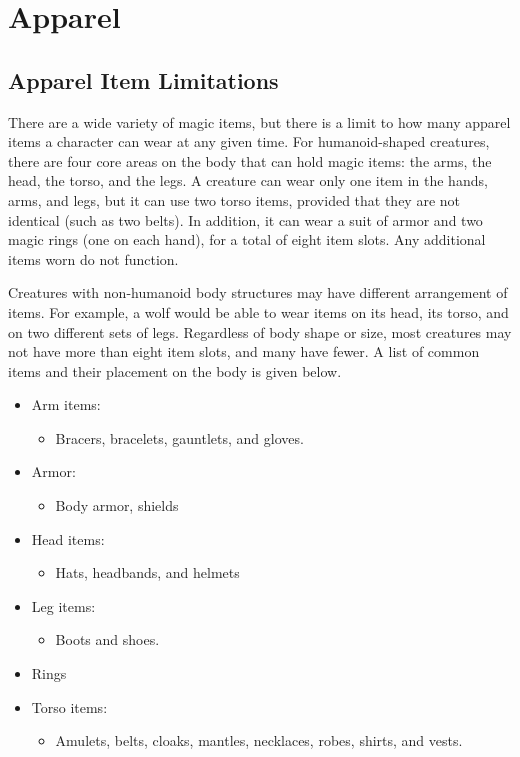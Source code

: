 \section{Apparel}

    \subsection{Apparel Item Limitations}

        There are a wide variety of magic items, but there is a limit to how many apparel items a character can wear at any given time.
        For humanoid-shaped creatures, there are four core areas on the body that can hold magic items: the arms, the head, the torso, and the legs.
        A creature can wear only one item in the hands, arms, and legs, but it can use two torso items, provided that they are not identical (such as two belts).
        In addition, it can wear a suit of armor and two magic rings (one on each hand), for a total of eight item slots.
        Any additional items worn do not function.

        Creatures with non-humanoid body structures may have different arrangement of items.
        For example, a wolf would be able to wear items on its head, its torso, and on two different sets of legs.
        Regardless of body shape or size, most creatures may not have more than eight item slots, and many have fewer.
        A list of common items and their placement on the body is given below.

        \begin{itemize}
            \item Arm items:
                \begin{itemize}
                    \item Bracers, bracelets, gauntlets, and gloves.
                \end{itemize}
            \item Armor:
                \begin{itemize}
                    \item Body armor, shields
                \end{itemize}
            \item Head items:
                \begin{itemize}
                    \item Hats, headbands, and helmets
                \end{itemize}
            \item Leg items:
                \begin{itemize}
                    \item Boots and shoes.
                \end{itemize}
            \item Rings
            \item Torso items:
                \begin{itemize}
                    \item Amulets, belts, cloaks, mantles, necklaces, robes, shirts, and vests.
                \end{itemize}
        \end{itemize}

